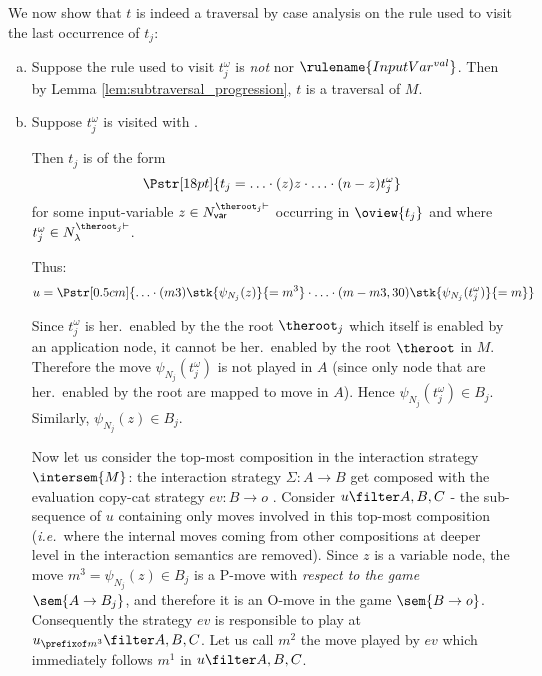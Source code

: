 \begin{enumerate}[$\bullet$]
\begin{enumerate}
\begin{itemize}
    We now show that $t$ is indeed a traversal by case analysis on the rule used to visit the last occurrence of $t_j$:
    \begin{enumerate}[(a)]
    \item  Suppose the rule used to visit $t_j^\omega$ is \emph{not}  nor $\rulename{InputVar^{val}}$.
        Then by Lemma \ref{lem:subtraversal_progression}, $t$ is a traversal of $M$.

    \item Suppose $t_j^\omega$ is visited with .

        Then $t_j$ is of the form
        $$\Pstr[18pt]{ t_j = \ldots \cdot (z)z \cdot \ldots \cdot (n-z){t_j^\omega}}$$
        for some input-variable $z \in
        N^{\theroot_j\vdash}_{\sf var}$ occurring in
        $\oview{t_j}$ and where $t_j^\omega \in N_\lambda^{\theroot_j\vdash}$.


        Thus:
        $$u = \Pstr[0.5cm]{ \ldots \cdot (m3){\stk{\psi_{N_j}(z)}{=m^3}} \cdot
                    \ldots \cdot (m-m3,30){\stk{\psi_{N_j}(t_j^\omega)}{=m}} } $$



        Since $t_j^\omega$ is her.\ enabled by the the root
        $\theroot_j$ which itself is enabled by an
        application node, it cannot be her.\ enabled by the
        root $\theroot$ in $M$. Therefore the move
        $\psi_{N_j}(t_j^\omega)$ is not played in $A$ (since
        only node that are her.\ enabled by the root are
        mapped to move in $A$). Hence $\psi_{N_j}(t_j^\omega) \in B_j$.
        Similarly, $\psi_{N_j}(z) \in B_j$.

        Now let us consider the top-most composition in the interaction strategy $\intersem{M}$: the interaction strategy $\Sigma: A \rightarrow B$ get composed with the evaluation copy-cat strategy $ev:B \rightarrow o$
        .
        Consider $ u \filter A,B,C$ - the sub-sequence of $u$ containing only moves involved in this top-most composition ({\it i.e.}\ where the internal moves coming from other compositions at deeper level in the interaction semantics are removed).
        Since $z$ is a variable node, the move $m^3 = \psi_{N_j}(z) \in B_j$ is a P-move with \emph{respect to the game} $\sem{A \rightarrow B_j}$, and therefore it is an O-move in the game $\sem{B \rightarrow o}$.
        Consequently the strategy $ev$ is responsible to play at $u_{\prefixof m^3} \filter A, B, C$. Let us call $m^2$ the move played by $ev$ which immediately follows $m^1$ in $u\filter A,B,C$.


\end{enumerate}
\end{itemize}
\end{enumerate}
\end{enumerate}
